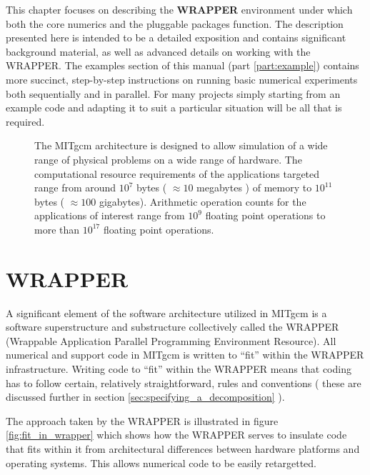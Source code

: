 This chapter focuses on describing the {\bf WRAPPER} environment under which
both the core numerics and the pluggable packages function. The description
presented here is intended to be a detailed exposition and contains significant
background material, as well as advanced details on working with the WRAPPER. 
The examples section of this manual (part \ref{part:example}) contains more
succinct, step-by-step instructions on running basic numerical
experiments both sequentially and in parallel. For many projects simply 
starting from an example code and adapting it to suit a particular situation 
will be all that is required.


\begin{figure}
\begin{center}
\end{center}
\caption{
The MITgcm architecture is designed to allow simulation of a wide 
range of physical problems on a wide range of hardware. The computational 
resource requirements of the applications targeted range from around 
$10^7$ bytes ( $\approx 10$ megabytes ) of memory to $10^{11}$ bytes
( $\approx 100$ gigabytes). Arithmetic operation counts for the applications of 
interest range from $10^{9}$ floating point operations to more than $10^{17}$ 
floating point operations.}
\label{fig:mitgcm_architecture_goals}
\end{figure}

\section{WRAPPER}

A significant element of the software architecture utilized in
MITgcm is a software superstructure and substructure collectively
called the WRAPPER (Wrappable Application Parallel Programming 
Environment Resource). All numerical and support code in MITgcm is written 
to ``fit'' within the WRAPPER infrastructure. Writing code to ``fit'' within 
the WRAPPER means that coding has to follow certain, relatively
straightforward, rules and conventions ( these are discussed further in 
section \ref{sec:specifying_a_decomposition} ).

The approach taken by the WRAPPER is illustrated in figure 
\ref{fig:fit_in_wrapper} which shows how the WRAPPER serves to insulate code 
that fits within it from architectural differences between hardware platforms 
and operating systems. This allows numerical code to be easily retargetted. 


